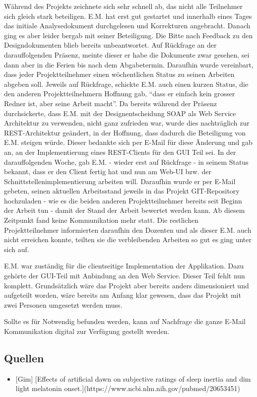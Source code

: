 \documentclass[]{article}
\providecommand{\tightlist}{%
  \setlength{\itemsep}{0pt}\setlength{\parskip}{0pt}}
\begin{document}
Während des Projekts zeichnete sich sehr schnell ab, das nicht alle
Teilnehmer sich gleich stark beteiligen. E.M. hat erst gut gestartet und
innerhalb eines Tages das initiale Analysedokument durchgelesen und
Korrekturen angebracht. Danach ging es aber leider bergab mit seiner
Beteiligung. Die Bitte nach Feedback zu den Designdokumenten blieb
bereits unbeantwortet. Auf Rückfrage an der darauffolgenden Präsenz,
meinte dieser er habe die Dokumente zwar gesehen, sei dann aber in die
Ferien bis nach dem Abgabetermin. Daraufhin wurde vereinbart, dass jeder
Projektteilnehmer einen wöchentlichen Status zu seinen Arbeiten abgeben
soll. Jeweils auf Rückfrage, schickte E.M. auch einen kurzen Status, die
den anderen Projektteilnehmern Hoffnung gab, ``dass er einfach kein
grosser Redner ist, aber seine Arbeit macht''. Da bereits während der
Präsenz durchsickerte, dass E.M. mit der Designentscheidung SOAP als Web
Service Architektur zu verwenden, nicht ganz zufrieden war, wurde dies
nachträglich zur REST-Architektur geändert, in der Hoffnung, dass
dadurch die Beteiligung von E.M. steigen würde. Dieser bedankte sich per
E-Mail für diese Änderung und gab an, an der Implementierung eines
REST-Clients für den GUI Teil sei. In der darauffolgenden Woche, gab
E.M. - wieder erst auf Rückfrage - in seinem Status bekannt, dass er den
Client fertig hat und nun am Web-UI bzw. der
Schnittstellenimplementierung arbeiten will. Daraufhin wurde er per
E-Mail gebeten, seinen aktuellen Arbeitsstand jeweils in das Projekt
GIT-Repository hochzuladen - wie es die beiden anderen Projektteilnehmer
bereits seit Beginn der Arbeit tun - damit der Stand der Arbeit bewertet
werden kann. Ab diesem Zeitpunkt fand keine Kommunikation mehr statt.
Die restlichen Projektteilnehmer informierten daraufhin den Dozenten und
als dieser E.M. auch nicht erreichen konnte, teilten sie die
verbleibenden Arbeiten so gut es ging unter sich auf.

E.M. war zuständig für die clientseitige Implementation der Applikation.
Dazu gehörte der GUI-Teil mit Anbindung an den Web Service. Dieser Teil
fehlt nun komplett. Grundsätzlich wäre das Projekt aber bereits anders
dimensioniert und aufgeteilt worden, wäre bereits am Anfang klar
gewesen, dass das Projekt mit zwei Personen umgesetzt werden muss.

Sollte es für Notwendig befunden werden, kann auf Nachfrage die ganze
E-Mail Kommunikation digital zur Verfügung gestellt werden.


\listoffigures

\subsection{Quellen}\label{quellen}


\begin{itemize}
\tightlist
\item
  {[}Gim{]} {[}Effects of artificial dawn on subjective ratings of sleep
  inertia and dim light melatonin
  onset.{]}(https://www.ncbi.nlm.nih.gov/pubmed/20653451)
\end{itemize}
\end{document}
